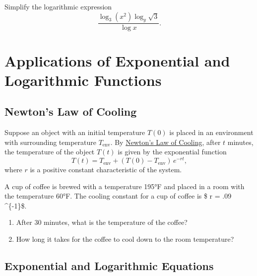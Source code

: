 \documentclass[
  en,11pt]{elegantbook}
\providecommand{\tightlist}{%
  \setlength{\itemsep}{0pt}\setlength{\parskip}{0pt}}
\newcommand{\size}[2]{{\fontsize{#1}{0}\selectfont#2}}
\renewenvironment{exercise}[1][]{
    \refstepcounter{exer}
    \par\noindent
    \makebox[-3pt][r]{\color{red!90}\size{12}{\HandPencilLeft}}
	\textbf{\color{main}{\exercisename} \theexer #1}
    \rmfamily
}{\par\ignorespacesafterend}
\newenvironment{rmdthink}{
	\vspace*{0.5\baselineskip}
	\par\noindent
	\makebox[-4pt][r]{\color{green!90}\size{12}{\faLightbulbO}\,\,}
    \begin{tcolorbox}[
    enhanced,
    title={\textbf{\color{second}Think}},
    title style={left color=blue!10!green!20!white,right color=yellow!20!blue!20!white},
    colback=green!20!white,
    ]
    \sffamily
}{
    \end{tcolorbox}
	\par\ignorespacesafterend
}
\begin{document}
\begin{exercise}
Simplify the logarithmic expression
\[
\frac{\log_3(x^2)\log_y\sqrt{3}}{\log x}.
\]
\end{exercise}

\hypertarget{applications-of-exponential-and-logarithmic-functions}{%
\chapter{Applications of Exponential and Logarithmic Functions}\label{applications-of-exponential-and-logarithmic-functions}}

\hypertarget{newtons-law-of-cooling}{%
\section{Newton's Law of Cooling}\label{newtons-law-of-cooling}}

\begin{rmdthink}

Suppose an object with an initial temperature \(T(0)\) is placed in an environment with surrounding temperature \(T_{\text{env}}\). By \href{https://en.wikipedia.org/wiki/Newton\%27s_law_of_cooling}{Newton's Law of Cooling}, after \(t\) minutes, the temperature of the object \(T(t)\) is given by the exponential function
\[
T(t)=T_{\text{env}}+(T(0)-T_{\text{env}})\,e^{-rt},
\]
where \(r\) is a positive constant characteristic of the system.

A cup of coffee is brewed with a temperature 195°F and placed in a room with the temperature 60°F. The cooling constant for a cup of coffee is \$ r = .09 \^{}\{-1\}\$.

\begin{enumerate}
\def\labelenumi{\arabic{enumi}.}
\tightlist
\item
  After 30 minutes, what is the temperature of the coffee?
\item
  How long it takes for the coffee to cool down to the room temperature?
\end{enumerate}

\end{rmdthink}

\hypertarget{exponential-and-logarithmic-equations}{%
\section{Exponential and Logarithmic Equations}\label{exponential-and-logarithmic-equations}}
\end{document}
